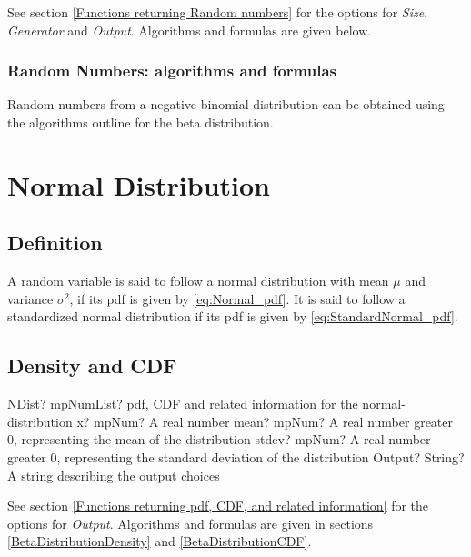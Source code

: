 \vspace{0.3cm}

See section \ref{Functions returning Random numbers} for the options for  {\itshape\sffamily Size},  {\itshape\sffamily Generator} and {\itshape\sffamily Output}. Algorithms and formulas are given below.

\subsubsection{Random Numbers: algorithms and formulas}
Random numbers from a negative binomial distribution can be obtained using the algorithms outline for the beta distribution.





\newpage
\section{Normal Distribution}
\label{sec:NormalDistribution}


\subsection{Definition}
\label{sec:NormalDistributionDefinition}
A random variable is said to follow a normal distribution with  mean $\mu$ and variance $\sigma^2$, if its pdf is given by \ref{eq:Normal_pdf}. It is said to follow a  standardized normal distribution if its pdf is given by \ref{eq:StandardNormal_pdf}.


\subsection{Density and CDF}

\begin{mpFunctionsExtract}
	\mpFunctionFourNotImplemented
	{NDist? mpNumList? pdf, CDF and related information for the normal-distribution}
	{x? mpNum? A real number}
	{mean? mpNum? A real number greater 0, representing the mean of the distribution}
	{stdev? mpNum? A real number greater 0, representing the standard deviation of the distribution}
	{Output? String? A string describing the output choices}
\end{mpFunctionsExtract}


\vspace{0.3cm}
See section \ref{Functions returning pdf, CDF, and related information} for the options for {\itshape\sffamily Output}. Algorithms and formulas are given in sections \ref{BetaDistributionDensity} and \ref{BetaDistributionCDF}.


